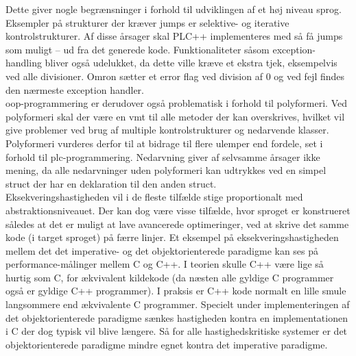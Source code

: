 



Dette giver nogle begrænsninger i forhold til udviklingen af et høj niveau sprog. Eksempler på strukturer der kræver jumps er selektive- og iterative kontrolstrukturer. Af disse årsager skal PLC++ implementeres med så få jumps som muligt – ud fra det generede kode. Funktionaliteter såsom exception-handling bliver også udelukket, da dette ville kræve et ekstra tjek, eksempelvis ved alle divisioner. Omron sætter et error flag ved division af 0 og ved fejl findes den nærmeste exception handler. \cite{exceptionHandling}\\

\noindent \gls{oop}-programmering er derudover også problematisk i forhold til polyformeri. Ved polyformeri skal der være en \gls{vmt} til alle metoder der kan overskrives, hvilket vil give problemer ved brug af multiple kontrolstrukturer og nedarvende klasser. Polyformeri vurderes derfor 
til at bidrage til flere ulemper end fordele, set i forhold til \gls{plc}-programmering. Nedarvning giver af selvsamme årsager ikke mening, da alle nedarvninger uden polyformeri kan udtrykkes ved en simpel struct der har en deklaration til den anden struct. \cite{Sebesta_2013}\\ 

\noindent Eksekveringshastigheden vil i de fleste tilfælde stige proportionalt med abstraktionsniveauet. Der kan dog være visse tilfælde, hvor sproget er konstrueret således at det er muligt at lave avancerede optimeringer, ved at skrive det samme kode (i target sproget) på færre linjer.
Et eksempel på eksekveringshastigheden mellem det det imperative- og det objektorienterede paradigme kan ses på performance-målinger mellem C og C++. I teorien skulle C++ være lige så hurtig som C, for ækvivalent kildekode (da næsten alle gyldige C programmer også er gyldige C++ programmer). I praksis er C++ kode normalt en lille smule langsommere end ækvivalente C programmer. Specielt under implementeringen af det objektorienterede paradigme sænkes hastigheden kontra en implementationen i C der dog typisk vil blive længere. Så for alle hastighedskritiske systemer er det objektorienterede paradigme mindre egnet kontra det imperative paradigme. \cite{codeprojectCPP} \cite{stackoverflowWhyCPP} \cite{linusWhyC} \cite{cVsCPPJOE}\\


